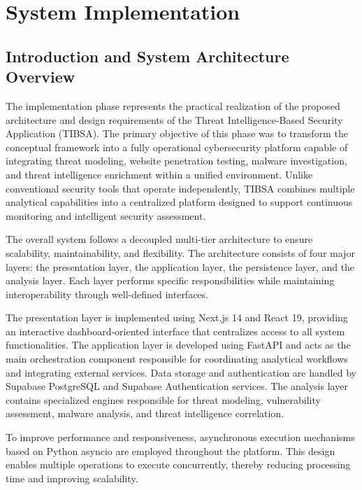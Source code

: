 \chapter{System Implementation}
\label{ch:chapter5}

\section{Introduction and System Architecture Overview}
The implementation phase represents the practical realization of the proposed architecture and design requirements of the Threat Intelligence-Based Security Application (TIBSA). The primary objective of this phase was to transform the conceptual framework into a fully operational cybersecurity platform capable of integrating threat modeling, website penetration testing, malware investigation, and threat intelligence enrichment within a unified environment. Unlike conventional security tools that operate independently, TIBSA combines multiple analytical capabilities into a centralized platform designed to support continuous monitoring and intelligent security assessment.

The overall system follows a decoupled multi-tier architecture to ensure scalability, maintainability, and flexibility. The architecture consists of four major layers: the presentation layer, the application layer, the persistence layer, and the analysis layer. Each layer performs specific responsibilities while maintaining interoperability through well-defined interfaces.

The presentation layer is implemented using Next.js 14 and React 19, providing an interactive dashboard-oriented interface that centralizes access to all system functionalities. The application layer is developed using FastAPI and acts as the main orchestration component responsible for coordinating analytical workflows and integrating external services. Data storage and authentication are handled by Supabase PostgreSQL and Supabase Authentication services. The analysis layer contains specialized engines responsible for threat modeling, vulnerability assessment, malware analysis, and threat intelligence correlation.

To improve performance and responsiveness, asynchronous execution mechanisms based on Python asyncio are employed throughout the platform. This design enables multiple operations to execute concurrently, thereby reducing processing time and improving scalability.

